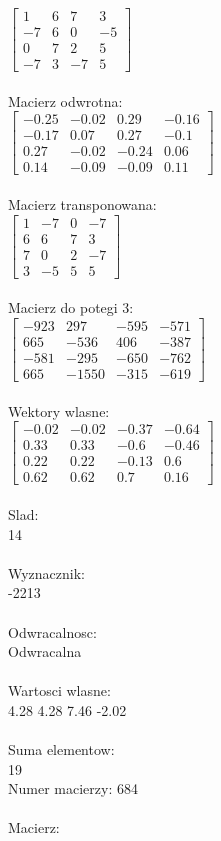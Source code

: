 \documentclass[a4paper,12pt]{article}
\begin{document}
$\begin{bmatrix} 1&6&7&3\\-7&6&0&-5\\0&7&2&5\\-7&3&-7&5 \end{bmatrix}$
\\
\\
Macierz odwrotna:\\

$\begin{bmatrix} -0.25&-0.02&0.29&-0.16\\-0.17&0.07&0.27&-0.1\\0.27&-0.02&-0.24&0.06\\0.14&-0.09&-0.09&0.11 \end{bmatrix}$
\\
\\
Macierz transponowana:\\

$\begin{bmatrix} 1&-7&0&-7\\6&6&7&3\\7&0&2&-7\\3&-5&5&5 \end{bmatrix}$
\\
\\
Macierz do potegi 3:\\

$\begin{bmatrix} -923&297&-595&-571\\665&-536&406&-387\\-581&-295&-650&-762\\665&-1550&-315&-619 \end{bmatrix}$
\\
\\
Wektory wlasne:\\

$\begin{bmatrix} -0.02&-0.02&-0.37&-0.64\\0.33&0.33&-0.6&-0.46\\0.22&0.22&-0.13&0.6\\0.62&0.62&0.7&0.16 \end{bmatrix}$
\\
\\
Slad:\\
14
\\
\\
Wyznacznik:\\
-2213
\\
\\
Odwracalnosc:\\
Odwracalna
\\
\\
Wartosci wlasne:\\
4.28 4.28 7.46 -2.02
\\
\\
Suma elementow:\\
19
\\
\newpage
Numer macierzy:
684
\\
\\
Macierz:\\
\end{document}
